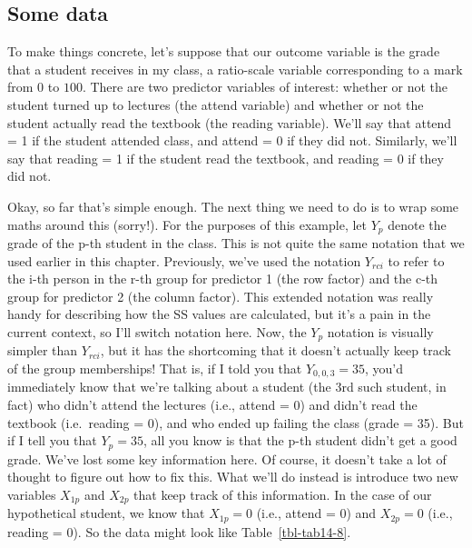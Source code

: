 \documentclass[
  a4paper,
]{book}
\begin{document}
\hypertarget{some-data}{%
\subsection{Some data}\label{some-data}}

To make things concrete, let's suppose that our outcome variable is the
grade that a student receives in my class, a ratio-scale variable
corresponding to a mark from \(0%
\) to \(100%
\). There are two predictor variables of interest: whether or not the
student turned up to lectures (the attend variable) and whether or not
the student actually read the textbook (the reading variable). We'll say
that attend = 1 if the student attended class, and attend = 0 if they
did not. Similarly, we'll say that reading = 1 if the student read the
textbook, and reading = 0 if they did not.

Okay, so far that's simple enough. The next thing we need to do is to
wrap some maths around this (sorry!). For the purposes of this example,
let \(Y_p\) denote the grade of the p-th student in the class. This is
not quite the same notation that we used earlier in this chapter.
Previously, we've used the notation \(Y_{rci}\) to refer to the i-th
person in the r-th group for predictor 1 (the row factor) and the c-th
group for predictor 2 (the column factor). This extended notation was
really handy for describing how the SS values are calculated, but it's a
pain in the current context, so I'll switch notation here. Now, the
\(Y_p\) notation is visually simpler than \(Y_{rci}\), but it has the
shortcoming that it doesn't actually keep track of the group
memberships! That is, if I told you that \(Y_{0,0,3} = 35\), you'd
immediately know that we're talking about a student (the 3rd such
student, in fact) who didn't attend the lectures (i.e., attend = 0) and
didn't read the textbook (i.e.~reading = 0), and who ended up failing
the class (grade = 35). But if I tell you that \(Y_p = 35\), all you
know is that the p-th student didn't get a good grade. We've lost some
key information here. Of course, it doesn't take a lot of thought to
figure out how to fix this. What we'll do instead is introduce two new
variables \(X_{1p}\) and \(X_{2p}\) that keep track of this information.
In the case of our hypothetical student, we know that \(X_{1p} = 0\)
(i.e., attend = 0) and \(X_{2p} = 0\) (i.e., reading = 0). So the data
might look like Table~\ref{tbl-tab14-8}.

\hypertarget{tbl-tab14-8}{}
 
  \providecommand{\huxb}[2]{\arrayrulecolor[RGB]{#1}\global\arrayrulewidth=#2pt}
  \providecommand{\huxvb}[2]{\color[RGB]{#1}\vrule width #2pt}
  \providecommand{\huxtpad}[1]{\rule{0pt}{#1}}
  \providecommand{\huxbpad}[1]{\rule[-#1]{0pt}{#1}}
\end{document}
